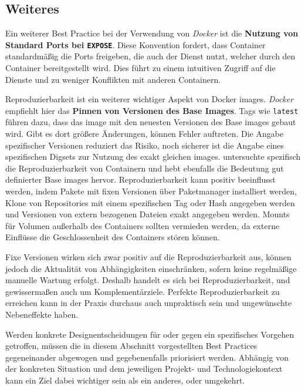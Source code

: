 \subsection{Weiteres}
\label{subsec:05-03-04_further}

Ein weiterer Best Practice bei der Verwendung von \textit{Docker} ist die \textbf{Nutzung von Standard Ports bei \texttt{EXPOSE}}. Diese Konvention fordert, dass Container standardmäßig die Ports freigeben, die auch der Dienst nutzt, welcher durch den Container bereitgestellt wird. Dies führt zu einem intuitiven Zugriff auf die Dienste und zu weniger Konflikten mit anderen Containern. \cite{300:Building-Best-Practices}

Reproduzierbarkeit ist ein weiterer wichtiger Aspekt von Docker \Glspl{image}. \textit{Docker} empfiehlt hier das \textbf{Pinnen von Versionen des Base Images}. Tags wie \texttt{latest} führen dazu, dass das \Gls{image} mit den neuesten Versionen des Base \Glspl{image} gebaut wird. Gibt es dort größere Änderungen, können Fehler auftreten. Die Angabe spezifischer Versionen reduziert das Risiko, noch sicherer ist die Angabe eines spezifischen Digsets zur Nutzung des exakt gleichen \Glspl{image}. \cite{300:Building-Best-Practices} \citeauthor{013:Role-of-Containers-in-Reproducibility} untersuchte spezifisch die Reproduzierbarkeit von Containern und hebt ebenfalls die Bedeutung gut definierter Base \Glspl{image} hervor. Reproduzierbarkeit kann positiv beeinflusst werden, indem Pakete mit fixen Versionen über Paketmanager installiert werden, Klone von Repositories mit einem spezifischen Tag oder Hash angegeben werden und Versionen von extern bezogenen Dateien exakt angegeben werden. Mounts für Volumen außerhalb des Containers sollten vermieden werden, da externe Einflüsse die Geschlossenheit des Containers stören können. \cite{013:Role-of-Containers-in-Reproducibility}

Fixe Versionen wirken sich zwar positiv auf die Reproduzierbarkeit aus, können jedoch die Aktualität von Abhängigkeiten einschränken, sofern keine regelmäßige manuelle Wartung erfolgt. Deshalb handelt es sich bei Reproduzierbarkeit,  und  gewissermaßen auch um Komplementärziele. Perfekte Reproduzierbarkeit zu erreichen kann in der Praxis durchaus auch unpraktisch sein und ungewünschte Nebeneffekte haben. \cite{013:Role-of-Containers-in-Reproducibility}

Werden konkrete Designentscheidungen für oder gegen ein spezifisches Vorgehen getroffen, müssen die in diesem Abschnitt vorgestellten Best Practices gegeneinander abgewogen und gegebenenfalls priorisiert werden. Abhängig von der konkreten Situation und dem jeweiligen Projekt- und Technologiekontext kann ein Ziel dabei wichtiger sein als ein anderes, oder umgekehrt.
